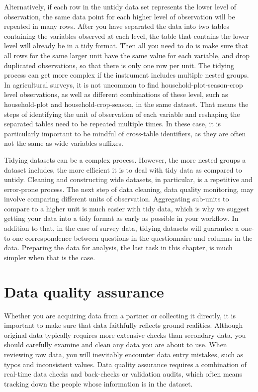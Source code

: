 Alternatively, if each row in the untidy data set represents the lower level of observation,
the same data point for each higher level of observation will be repeated in many rows.
After you have separated the data into two tables containing the variables observed at each level,
the table that contains the lower level will already be in a tidy format.
Then all you need to do is make sure that 
all rows for the same larger unit have the same value for each variable,
and drop duplicated observations,
so that there is only one row per unit.
The tidying process can get more complex if the instrument includes multiple nested groups.
In agricultural surveys, it is not uncommon to find household-plot-season-crop level observations,
as well as different combinations of these level,
such as household-plot and household-crop-season, in the same dataset.
That means the steps of identifying the unit of observation of each variable
and reshaping the separated tables need to be repeated multiple times.
In these case, it is particularly important to be mindful of cross-table identifiers,
as they are often not the same as wide variables suffixes.

Tidying datasets can be a complex process.
However, the more nested groups a dataset includes,
the more efficient it is to deal with tidy data as compared to untidy.
Cleaning and constructing wide datasets, in particular,
is a repetitive and error-prone process.
The next step of data cleaning, data quality monitoring,
may involve comparing different units of observation.
Aggregating sub-units to compare to a higher unit is much easier with tidy data,
which is why we suggest getting your data into a tidy format as early as possible in your workflow. 
In addition to that, in the case of survey data,
tidying datasets will guarantee a one-to-one correspondence
between questions in the questionnaire and columns in the data.
Preparing the data for analysis, the last task in this chapter, 
is much simpler when that is the case. 
 
\section{Data quality assurance}

Whether you are acquiring data from a partner or collecting it directly,
it is important to make sure that data faithfully reflects ground realities.
Although original data typically requires more extensive checks than secondary data,
you should carefully examine and clean any data you are about to use.
When reviewing raw data, you will inevitably encounter data entry mistakes,
such as typos and inconsistent values.
Data quality assurance requires a combination of real-time data checks
and back-checks or validation audits, which often means tracking down
the people whose information is in the dataset.

